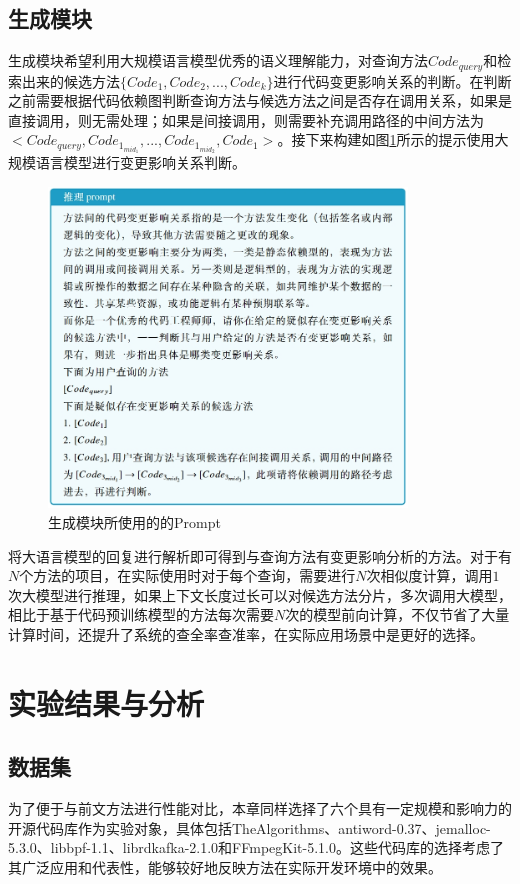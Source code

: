 \subsection{生成模块}

生成模块希望利用大规模语言模型优秀的语义理解能力，对查询方法$Code_{query}$和检索出来的候选方法$\{Code_1,Code_2,...,Code_k\}$进行代码变更影响关系的判断。在判断之前需要根据代码依赖图判断查询方法与候选方法之间是否存在调用关系，如果是直接调用，则无需处理；如果是间接调用，则需要补充调用路径的中间方法为$<Code_{query},Code_{1_{mid_1}},...,Code_{1_{mid_2}},Code_1>$。接下来构建如图\ref{2_推理prompt}所示的提示使用大规模语言模型进行变更影响关系判断。

\begin{figure}[htbp]
\centering
\includegraphics[width = 0.85\textwidth]{figures/2_推理prompt.png}
\caption{生成模块所使用的的Prompt}
\label{2_推理prompt}
\end{figure}


将大语言模型的回复进行解析即可得到与查询方法有变更影响分析的方法。对于有$N$个方法的项目，在实际使用时对于每个查询，需要进行$N$次相似度计算，调用$1$次大模型进行推理，如果上下文长度过长可以对候选方法分片，多次调用大模型，相比于基于代码预训练模型的方法每次需要$N$次的模型前向计算，不仅节省了大量计算时间，还提升了系统的查全率查准率，在实际应用场景中是更好的选择。


\section{实验结果与分析}

\subsection{数据集}
为了便于与前文方法进行性能对比，本章同样选择了六个具有一定规模和影响力的开源代码库作为实验对象，具体包括TheAlgorithms、antiword-0.37、jemalloc-5.3.0、libbpf-1.1、librdkafka-2.1.0和FFmpegKit-5.1.0。这些代码库的选择考虑了其广泛应用和代表性，能够较好地反映方法在实际开发环境中的效果。


